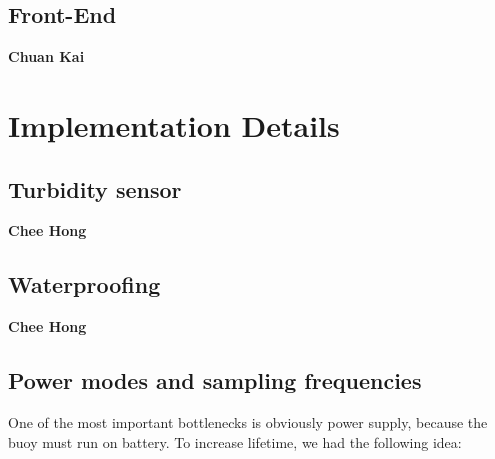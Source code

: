 \documentclass{article}
\begin{document}
\subsection{Front-End}

\textbf{Chuan Kai}

\section{Implementation Details}

\subsection{Turbidity sensor}

\textbf{Chee Hong}

\subsection{Waterproofing}

\textbf{Chee Hong}

\subsection{Power modes and sampling frequencies}

One of the most important bottlenecks is obviously power supply, because the buoy must run on battery. To increase lifetime, we had the following idea:
\end{document}
